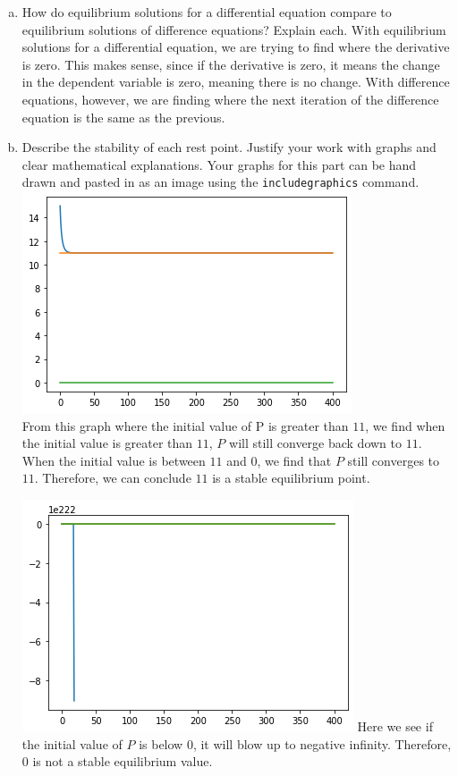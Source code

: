 \documentclass[12pt,letterpaper]{article}
\begin{document}
\begin{enumerate}
\begin{enumerate}[a)]
\item How do equilibrium solutions for a differential equation compare to equilibrium solutions of difference equations?  Explain each.
With equilibrium solutions for a differential equation, we are trying to find where the 
derivative is zero. This makes sense, since if the derivative is zero, it means the 
change in the dependent variable is zero, meaning there is no change. With difference equations, 
however, we are finding where the next iteration of the difference equation is the same
as the previous. 

\item Describe the stability of each rest point. Justify your work with graphs and clear mathematical explanations. Your graphs for this part can be hand drawn and pasted in as an image using the {\tt includegraphics} command.\\
\includegraphics{number5egreater.png}\\
From this graph where the initial value of P is greater than $11$, we find when the 
initial value is greater than $11$, $P$ will still converge back down to $11$. When the 
initial value is between $11$ and $0$, we find that $P$ still converges to $11$. Therefore, 
we can conclude $11$ is a stable equilibrium point. 

\includegraphics{number5eless.png}
Here we see if the initial value of $P$ is below $0$, it will blow up to negative infinity. 
Therefore, $0$ is not a stable equilibrium value. 


\end{enumerate}
\end{enumerate}
\end{document}
